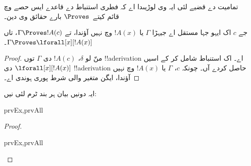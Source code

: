 \documentclass[../../../include/open-logic-section]{subfiles}
\begin{document}


\begin{explain}
  تمامیت دے قضیے لئی ایہ وی لوڑیںدا اے کہ فطری استنباط دے قاعدے
  ایس حصے وچ قائم کیتے~$\Proves$ بارے حقائق وی دین۔
\end{explain}

\begin{thm}
 جے $c$ اک ایہو جہا مستقل اے جیہڑا
$\Gamma$ یا $!A(x)$ وچ نہیں آؤندا، تے $\Gamma \Proves !A(c)$، تاں $\Gamma
\Proves \lforall[x][!A(x)]$۔
\end{thm}

\begin{proof}
منّ لو $\delta$، $!A(c)$ دی $\Gamma$ توں !!a{derivation} اے۔
اک \Intro{\lforall} استنباط شامل کر کے اسیں
$\lforall[x][!A(x)]$ دی !!a{derivation} حاصل کردے آں۔ چونکہ $c$،
$\Gamma$ یا $!A(x)$ وچ نہیں آؤندا، ایگن متغیر والی شرط پوری ہوندی اے۔
\end{proof}

\begin{prop}
ایہ دونیں بیان ہر بند ٹرم لئی نیں:
\begin{tagenumerate}{prvEx,prvAll}

\end{tagenumerate}
\end{prop}

\begin{proof}
\begin{tagenumerate}{prvEx,prvAll}

\end{tagenumerate}
\end{proof}
\end{document}
